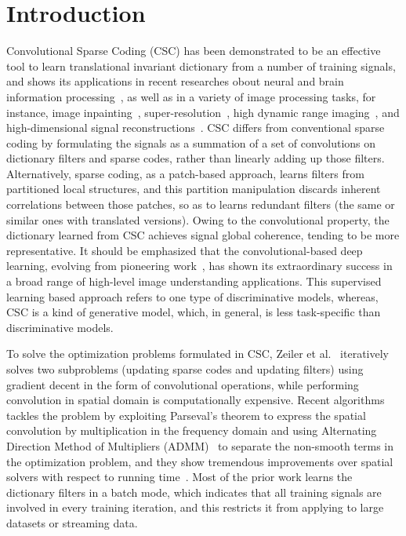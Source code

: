 \section{Introduction}
Convolutional Sparse Coding (CSC) has been demonstrated to be an effective tool to learn translational invariant dictionary from a number of training signals, and shows its applications in recent researches obout neural and brain information processing~\cite{jas2017learning,peter2017sparse}, as well as in a variety of image processing tasks, for instance, image inpainting~\cite{heide2015fast}, super-resolution~\cite{gu2015convolutional}, high dynamic range imaging~\cite{serrano2016convolutional}, and high-dimensional signal reconstructions~\cite{choudhury2017consensus,bibi2017high}. CSC differs from conventional sparse coding by formulating the signals as a summation of a set of convolutions on dictionary filters and sparse codes, rather than linearly adding up those filters. Alternatively, sparse coding, as a patch-based approach, learns filters from partitioned local structures, and this partition manipulation discards inherent correlations between those patches, so as to learns redundant filters (the same or similar ones with translated versions). Owing to the convolutional property, the dictionary learned from CSC achieves signal global coherence, tending to be more representative. It should be emphasized that the convolutional-based deep learning, evolving from pioneering work~\cite{lecun1998gradient,kavukcuoglu2010learning,krizhevsky2012imagenet}, has shown its extraordinary success in a broad range of high-level image understanding applications. This supervised learning based approach refers to one type of discriminative models, whereas, CSC is a kind of generative model, which, in general, is less task-specific than discriminative models.

To solve the optimization problems formulated in CSC, Zeiler et al.~\cite{zeiler2010deconvolutional} iteratively solves two subproblems (updating sparse codes and updating filters) using gradient decent in the form of convolutional operations, while performing convolution in spatial domain is computationally expensive. Recent algorithms tackles the problem by exploiting Parseval's theorem to express the spatial convolution by multiplication in the frequency domain and using Alternating Direction Method of Multipliers (ADMM)~\cite{boyd2011distributed} to separate the non-smooth terms in the optimization problem, and they show tremendous improvements over spatial solvers with respect to running time~\cite{bristow2013fast,heide2015fast,wohlberg2016efficient}. Most of the prior work learns the dictionary filters in a batch mode, which indicates that all training signals are involved in every training iteration, and this restricts it from applying to large datasets or streaming data. 

